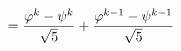 \documentclass[preview]{standalone}
\begin{document}
\begin{align*}
\special{dvisvgm:raw <g id='unique000'>}= \frac{\varphi^k - \psi^k}{\sqrt{5}}+ \frac{\varphi^{k-1} - \psi^{k-1}}{\sqrt{5}}\special{dvisvgm:raw </g>}
\end{align*}
\end{document}
